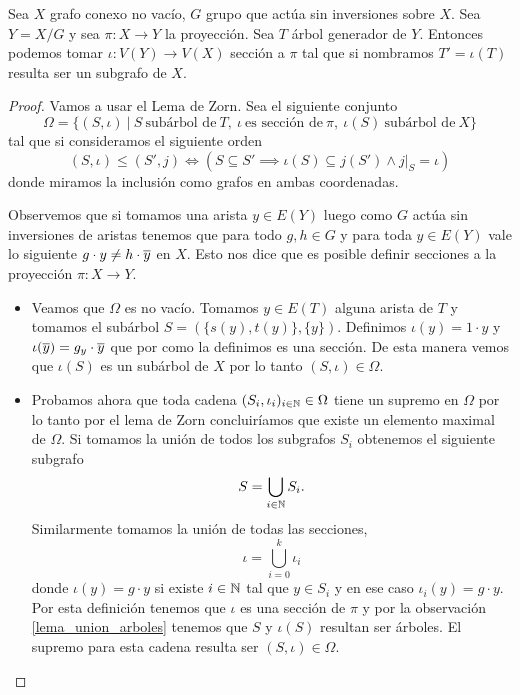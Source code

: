 \documentclass[tesis.tex]{subfiles}
\begin{document}
\begin{prop}\label{prop_levantado_accion_arbol}
	Sea $X$ grafo conexo no vacío, $G$ grupo que actúa sin inversiones sobre $X$.
	Sea $Y= X / G$ y sea $\pi:X \to Y$ la proyección. 
	Sea $T$ árbol generador de $Y$.
	Entonces podemos tomar $\iota:V(Y) \to V(X)$ sección a $\pi$ tal que si nombramos $T' = \iota(T)$ resulta ser un subgrafo de $X$.
\end{prop}

\begin{proof}
	Vamos a usar el Lema de Zorn.
	Sea el siguiente conjunto
	\[
	\Omega = \{ (S, \iota)	  \ | \   S \ \text{subárbol de} \ T, \ \iota \ \text{es sección de} \ \pi, \ \iota (S) \ \text{subárbol de} \ X  \}
	\]
	tal que si consideramos el siguiente orden
	\[
	(S,\iota) \le (S', j) \iff (S \subseteq S' \implies \iota(S) \subseteq j(S') \land \left. j \right|_{S} = \iota)
	\]
	donde miramos la inclusión como grafos en ambas coordenadas.
	
	Observemos que si tomamos una arista $y \in E(Y)$ luego como $G$ actúa sin inversiones de aristas tenemos que para todo $g,h \in G$ y para toda $y \in E(Y)$ vale lo siguiente $g \cdot y \neq h \cdot \overline{y}$ en $X$. 
	Esto nos dice que es posible definir secciones a la proyección $\pi:X \to Y$.
	
	\begin{itemize}
		\item Veamos que $\Omega$ es no vacío.
		Tomamos $y \in E(T)$ alguna arista de $T$ y tomamos el subárbol $S = (\{ s(y), t(y) \}, \{y\})$. 
		Definimos $\iota(y) = 1 \cdot y$ y $\iota(\overline y) = g_{y} \cdot \overline{y}$ que por como la definimos es una sección.
		De esta manera vemos que $\iota(S)$ es un subárbol de $X$ por lo tanto $(S, \iota) \in \Omega$.
		\item Probamos ahora que toda cadena $(S_i, \iota_i)_{i \in \mathbb{N}} \in \Omega$ tiene un supremo en $\Omega$ por lo tanto por el lema de Zorn concluiríamos que existe un elemento maximal de $\Omega$.
		Si tomamos la unión de todos los subgrafos $S_{i}$ obtenemos el siguiente subgrafo
		\begin{equation*}
			S = \bigcup_{i \in \mathbb{N}} S_{i}.
		\end{equation*}
		Similarmente tomamos la unión de todas las secciones,
		\[
		\iota = \bigcup_{i = 0}^{k} \iota_i
		\]
		donde $\iota(y) = g \cdot y$ si existe $i \in \mathbb{N}$ tal que $y \in S_{i}$ y en ese caso $\iota_{i}(y) = g\cdot y$.
		Por esta definición tenemos que $\iota$ es una sección de $\pi$ y por la observación \ref{lema_union_arboles} tenemos que $S$ y $\iota(S)$ resultan ser árboles.
		El supremo para esta cadena resulta ser $(S, \iota) \in \Omega$.
	\end{itemize}
	

\end{proof}
\end{document}
